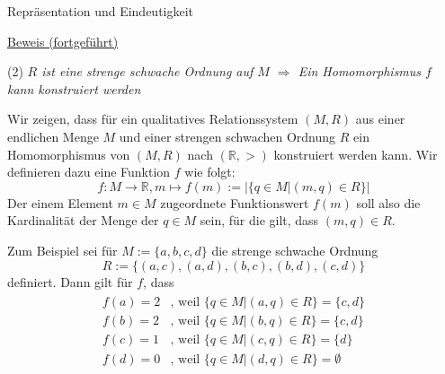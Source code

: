 \documentclass[
  8pt,
  ignorenonframetext,
]{beamer}
\begin{document}
\begin{frame}{Repräsentation und Eindeutigkeit}
\protect\hypertarget{repruxe4sentation-und-eindeutigkeit-2}{}
\footnotesize

\underline{Beweis (fortgeführt)}

\noindent (2) \emph{\(R\) ist eine strenge schwache Ordnung auf \(M\)
\(\Rightarrow\) Ein Homomorphismus \(f\) kann konstruiert werden}

Wir zeigen, dass für ein qualitatives Relationssystem \((M,R)\) aus
einer endlichen Menge \(M\) und einer strengen schwachen Ordnung \(R\)
ein Homomorphismus von \((M,R)\) nach \((\mathbb{R},>)\) konstruiert
werden kann. Wir definieren dazu eine Funktion \(f\) wie folgt:
\begin{equation}
f : M \to \mathbb{R}, m \mapsto f(m) := |\{q \in M|(m,q) \in R\}| 
\end{equation} Der einem Element \(m \in M\) zugeordnete Funktionswert
\(f(m)\) soll also die Kardinalität der Menge der \(q \in M\) sein, für
die gilt, dass \((m,q) \in R\).

Zum Beispiel sei für \(M := \{a,b,c,d\}\) die strenge schwache Ordnung
\begin{equation}
R := \{(a,c), (a,d), (b,c), (b,d), (c,d)\}
\end{equation} definiert. Dann gilt für \(f\), dass \begin{align}
\begin{split}
f(a) = 2 & \mbox{, weil } \{q \in M|(a,q) \in R\} = \{c,d\}    \\
f(b) = 2 & \mbox{, weil } \{q \in M|(b,q) \in R\} = \{c,d\}    \\
f(c) = 1 & \mbox{, weil } \{q \in M|(c,q) \in R\} = \{d\}      \\
f(d) = 0 & \mbox{, weil } \{q \in M|(d,q) \in R\} = \emptyset  \\
\end{split}
\end{align}
\end{frame}
\end{document}
